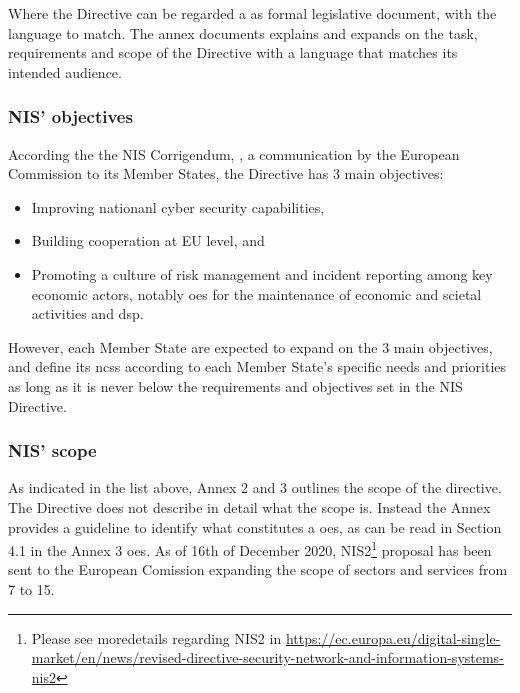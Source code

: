 Where the Directive can be regarded a as formal legislative document, with the language to match. The annex documents explains and expands on the task, requirements and scope of the Directive with a language that matches its intended audience.

\subsubsection{NIS' objectives}
According the the NIS Corrigendum, \cite{EuropeanCommission2017} , a communication by the European Commission to its Member States, the Directive has 3 main objectives:

\begin{itemize}
    \item Improving nationanl cyber security capabilities,
    \item Building cooperation at EU level, and
    \item Promoting a culture of risk management and incident reporting among key economic actors, notably \acrfull{oes} for the maintenance of economic and scietal activities and \acrfull{dsp}.
\end{itemize}

However, each Member State are expected to expand on the 3 main objectives, and define its \acrshort{ncss} according to each Member State's specific needs and priorities as long as it is never below the requirements and objectives set in the NIS Directive.

\subsubsection{NIS' scope}

As indicated in the list above, Annex 2 and 3 outlines the scope of the directive. The Directive does not describe in detail what the scope is. Instead the Annex provides a guideline to identify what constitutes a \acrfull{oes}, as can be read in Section 4.1 in the Annex 3 \acrshort{oes}. As of 16th of December 2020, NIS2\footnote[4]{Please see moredetails regarding NIS2 in \url{https://ec.europa.eu/digital-single-market/en/news/revised-directive-security-network-and-information-systems-nis2}} proposal has been sent to the European Comission expanding the scope of sectors and services from 7 to 15. 

